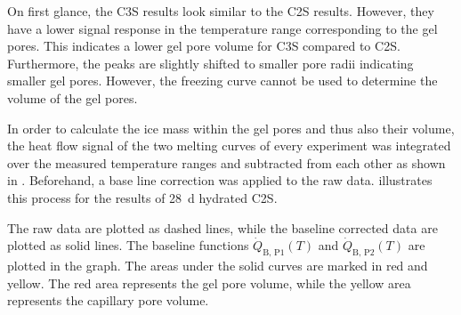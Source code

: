 On first glance, the \ac{C3S} results look similar to the \ac{C2S} results.
However, they have a lower signal response in the temperature range corresponding to the gel pores.
This indicates a lower gel pore volume for \ac{C3S} compared to \ac{C2S}.
Furthermore, the peaks are slightly shifted to smaller pore radii indicating smaller gel pores.
However, the freezing curve cannot be used to determine the volume of the gel pores.

In order to calculate the ice mass within the gel pores and thus also their volume, the heat flow signal of the two melting curves of every experiment was integrated over the measured temperature ranges and subtracted from each other as shown in .
Beforehand, a base line correction was applied to the raw data.
 illustrates this process for the results of \qty{28}{\day} hydrated \ac{C2S}.

The raw data are plotted as dashed lines, while the baseline corrected data are plotted as solid lines.
The baseline functions $\dot{Q}_\text{B, P1}(T)$ and $\dot{Q}_\text{B, P2}(T)$ are plotted in the graph.
The areas under the solid curves are marked in red and yellow.
The red area represents the gel pore volume, while the yellow area represents the capillary pore volume.

